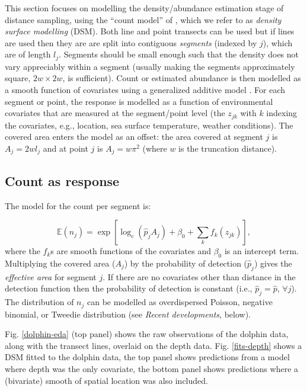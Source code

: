 \documentclass[a4paper,12pt]{article}
\begin{document}
This section focuses on modelling the density/abundance estimation stage of distance sampling, using the ``count model'' of \cite{Hedley:2004et}, which we refer to as \textit{density surface modelling} (DSM). Both line and point transects can be used but if lines are used then they are are split into contiguous \textit{segments} (indexed by $j$), which are of length $l_j$. Segments should be small enough such that the density does not vary appreciably within a segment (usually making the segments approximately square, $2w\times 2w$, is sufficient). Count or estimated abundance is then modelled as a smooth function of covariates using a generalized additive model \cite[GAM; e.g.][]{Wood:2006wz}. For each segment or point, the response is modelled as a function of environmental covariates that are measured at the segment/point level (the $z_{jk}$ with $k$ indexing the covariates, e.g., location, sea surface temperature, weather conditions). The covered area enters the model as an offset: the area covered at segment $j$ is $A_j = 2wl_j$ and at point $j$ is $A_j=w\pi^2$ (where $w$ is the truncation distance). 

\subsection*{Count as response}

The model for the count per segment is:

\begin{equation*}
\mathbb{E}(n_j) = \exp\left[ \log_e \left( \hat{p}_j A_j \right) + \beta_0 + \sum_k f_k\left(z_{jk}\right) \right],
\end{equation*}
where the $f_k$s are smooth functions of the covariates and $\beta_0$ is an intercept term. Multiplying the covered area ($A_j$) by the probability of detection ($\hat{p}_j$) gives the \textit{effective area} for segment $j$. If there are no covariates other than distance in the detection function then the probability of detection is constant (i.e., $\hat{p}_j=\hat{p}$, $\forall j$). The distribution of $n_j$ can be modelled as overdispersed Poisson, negative binomial, or Tweedie distribution (see \textit{Recent developments}, below).

Fig. \ref{dolphin-eda} (top panel) shows the raw observations of the dolphin data, along with the transect lines, overlaid on the depth data. Fig. \ref{fits-depth} shows a DSM fitted to the dolphin data, the top panel shows predictions from a model where depth was the only covariate, the bottom panel shows predictions where a (bivariate) smooth of spatial location was also included. 
\end{document}
